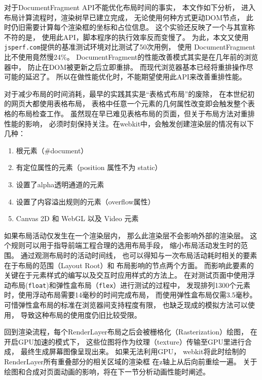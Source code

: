 对于DocumentFragment API不能优化布局时间的事实，
本文作如下分析，
进入布局计算流程时，渲染树早已建立完成，
无论使用何种方式更动DOM节点，
此时仍旧需要计算每个渲染框的坐标和占位信息。
这个实验还反映了一个与其宣称不符的是，
使用此API，脚本程序的执行效率反而变慢了。
为此，本文又使用\texttt{jsperf.com}提供的基准测试环境对比测试了50次用例，
使用 DocumentFragment 比不使用竟然慢24\%。
DocumentFragment的性能改善模式其实是在几年前的浏览器中，
防止在DOM被更新之后立即重排。
而现代浏览器基本已经将重排操作尽可能的延迟了。
所以在做性能优化时，不能期望使用此API来改善重排性能。

对于减少布局的时间消耗，最早的实践其实是``表格式布局''的废除，
在本世纪初的网页大都使用表格布局，
表格中任意一个元素的几何属性改变即会触发整个表格的布局检查工作。
虽然现在早已难见表格布局的页面，但关于布局方法对重排性能的影响，
必须时刻保持关注。在webkit中，会触发创建渲染层的情况有以下几种：
\begin{enumerate}
    \item 根元素（\#document）
    \item 有定位属性的元素（position 属性不为 static）
    \item 设置了alpha透明通道的元素
    \item 设置了内容溢出规则的元素（overflow属性）
    \item Canvas 2D 和 WebGL 以及 Video 元素
\end{enumerate}

如果布局活动仅发生在一个渲染层内，
那么此渲染层不会影响外部的渲染层。
这个规则可以用于指导前端工程合理的选用布局手段，
缩小布局活动发生时的范围。
通过观测布局时的活动时间线，
也可以得知与一次布局活动耗时相关的要素在于布局的范围（Layout Root）和
布局影响的节点两个方面。
而影响此要素的关键在于元素样式的编写以及交互时应用样式的方法上。
在对测试页面中使用浮动布局(\texttt{float})和弹性盒布局（\texttt{flex}）进行测试的过程中，
发现排列1300个元素时，使用浮动布局需要14毫秒的时间完成布局，
而使用弹性盒布局仅需3.5毫秒。
可惜弹性盒布局的标准在浏览器间支持程度有限，
也缺乏现成的模拟方法可以使用，
导致这种布局的使用度仍旧比较受限。

回到渲染流程，每个RenderLayer布局之后会被栅格化（Rasterization）绘图，
在开启GPU加速的模式下，
这些位图将作为纹理（texture）传输至GPU里进行合成\cite{duda2013gpu}，
最终生成屏幕图像呈现出来。
如果无法利用GPU，
webkit将此时绘制的RenderLayer所有重叠部分的相关区域的渲染框
在z轴上从后向前重绘一遍。
关于绘图和合成对页面动画的影响，将在下一节分析动画性能时阐述。


